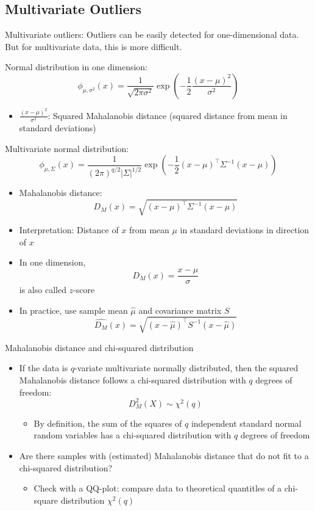 \documentclass[a4paper]{article}
\begin{document}
\subsection{Multivariate Outliers}

Multivariate outliers: Outliers can be easily detected for one-dimensional data. But for multivariate data, this is more difficult.

Normal distribution in one dimension:
\begin{equation*}
    \phi_{\mu,\sigma^2}(x)=\frac{1}{\sqrt{2\pi\sigma^2}}\exp\left(-\frac{1}{2}\frac{(x-\mu)^2}{\sigma^2} \right)
\end{equation*}
\begin{itemize}
    \item $\frac{(x-\mu)^2}{\sigma^2}$: Squared Mahalanobis distance (squared distance from mean in standard deviations)
\end{itemize}

Multivariate normal distribution:
\begin{equation*}
    \phi_{\mu,\Sigma}(x)=\frac{1}{(2\pi)^{q/2}|\Sigma|^{1/2}}\exp\left(-\frac{1}{2}(x-\mu)^{\intercal}\Sigma^{-1}(x-\mu) \right)
\end{equation*}
\begin{itemize}
    \item Mahalanobis distance:
    \[D_M(x)=\sqrt{(x-\mu)^{\intercal}\Sigma^{-1}(x-\mu)} \]
    \item Interpretation: Distance of $x$ from mean $\mu$ in standard deviations in direction of $x$
    \item In one dimension,
    \[D_M(x)=\frac{x-\mu}{\sigma} \]
    is also called $z$-score
    \item In practice, use sample mean $\hat{\mu}$ and covariance matrix $S$
    \[\widehat{D_M}(x)=\sqrt{(x-\hat{\mu})^{\intercal}S^{-1}(x-\hat{\mu})} \]
\end{itemize}

Mahalanobis distance and chi-squared distribution
\begin{itemize}
    \item If the data is $q$-variate multivariate normally distributed, then the squared Mahalanobis distance follows a chi-squared distribution with $q$ degrees of freedom:
    \[D_M^2(X)\sim\chi^2(q) \]
    \begin{itemize}
        \item By definition, the sum of the squares of $q$ independent standard normal random variables has a chi-squared distribution with $q$ degrees of freedom
    \end{itemize}
    \item Are there samples with (estimated) Mahalanobis distance that do not fit to a chi-squared distribution?
    \begin{itemize}
        \item Check with a QQ-plot: compare data to theoretical quantitles of a chi-square distribution $\chi^2(q)$
    \end{itemize}
\end{itemize}
\end{document}
